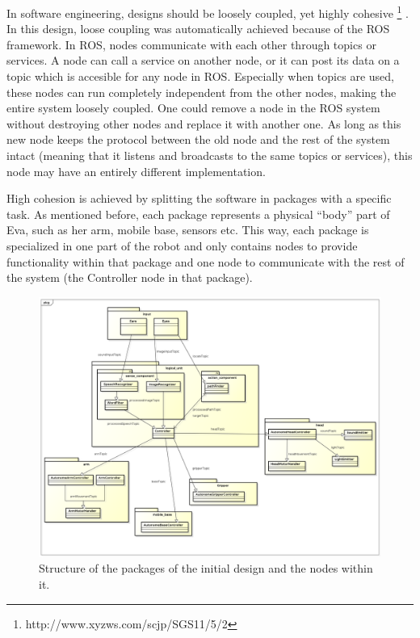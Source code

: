 \documentclass[technical_document.tex]{subfiles}
\begin{document}
In software engineering, designs should be loosely coupled, yet highly cohesive \footnote{http://www.xyzws.com/scjp/SGS11/5/2} . In this design, loose coupling was automatically achieved because of the ROS framework. In ROS, nodes communicate with each other through topics or services. A node can call a service on another node, or it can post its data on a topic which is accesible for any node in ROS. Especially when topics are used, these nodes can run completely independent from the other nodes, making the entire system loosely coupled. One could remove a node in the ROS system without destroying other nodes and replace it with another one. As long as this new node keeps the protocol between the old node and the rest of the system intact (meaning that it listens and broadcasts to the same topics or services), this node may have an entirely different implementation.

High cohesion is achieved by splitting the software in packages with a specific task. As mentioned before, each package represents a physical ``body'' part of Eva, such as her arm, mobile base, sensors etc. This way, each package is specialized in one part of the robot and only contains nodes to provide functionality within that package and one node to communicate with the rest of the system (the Controller node in that package).

\begin{figure}[h!]
	\centering
	\mbox{\includegraphics[scale=0.3]{Images/Node_structure.png}}
	\caption{Structure of the packages of the initial design and the nodes within it.}
	\label{fig:concept}
\end{figure}
\end{document}
